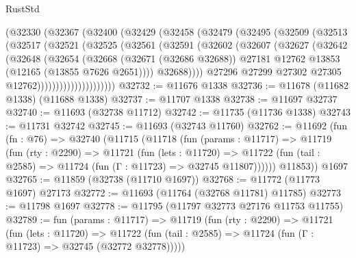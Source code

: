 \begin{lexlean}{RustStd}
\begin{coremodule}
                (@32330
                  (@32367
                    (@32400
                      (@32429
                        (@32458
                          (@32479
                            (@32495
                              (@32509
                                (@32513
                                  (@32517
                                    (@32521
                                      (@32525
                                        (@32561
                                          (@32591
                                            (@32602
                                              (@32607
                                                (@32627
                                                  (@32642
                                                    (@32648
                                                      (@32654
                                                        (@32668
                                                          (@32671 (@32686 @32688))
                                                          @27181
                                                          @12762
                                                          @13853
                                                          (@12165 (@13855 @7626 @2651))))
                                                      @32688))))
                                              @27296
                                              @27299
                                              @27302
                                              @27305
                                              @12762)))))))))))))))))))))
@32732 := @11676 @1338
@32736 := @11678 (@11682 @1338) (@11688 @1338)
@32737 := @11707 @1338
@32738 := @11697 @32737
@32740 := @11693 (@32738 @11712)
@32742 := @11735 (@11736 @1338)
@32743 := @11731 @32742
@32745 := @11693 (@32743 @11760)
@32762 := @11692
    (fun (fn : @76) =>
    @32740
      (@11715
        (@11718
          (fun (params : @11717) =>
          @11719
            (fun (rty : @2290) =>
            @11721
              (fun (lets : @11720) =>
              @11722 (fun (tail : @2585) => @11724 (fun (Γ : @11723) => @32745 @11807))))))
        @11853))
    @1697
@32765 := @11859 (@32738 (@11710 @1697))
@32768 := @11772 (@11773 @1697) @27173
@32772 := @11693 (@11764 (@32768 @11781) @11785)
@32773 := @11798 @1697
@32778 := @11795 (@11797 @32773 @27176 @11753 @11755)
@32789 := fun (params : @11717) =>
  @11719
    (fun (rty : @2290) =>
    @11721
      (fun (lets : @11720) =>
      @11722 (fun (tail : @2585) => @11724 (fun (Γ : @11723) => @32745 (@32772 @32778)))))

\end{coremodule}
\end{lexlean}

